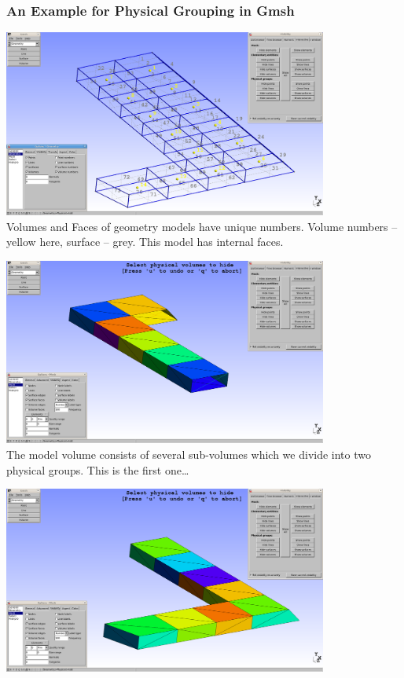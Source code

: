 \begin{frame}
  \frametitle<presentation>{An Example for Physical Grouping in Gmsh}
  \begin{center}
    \includegraphics[width=0.8\textwidth]{./EPS/L/L_numbers_vols_faces}\\[0.5em]
    Volumes and Faces of geometry models have unique numbers. Volume numbers --
    yellow here, surface -- grey. This model has internal faces.
  \end{center}
  \begin{center}
    \includegraphics[width=0.8\textwidth]{./EPS/L/L_volgroup1}\\[0.5em]
    The model volume consists of several sub-volumes which we divide into two
    physical groups. This is the first one\ldots
  \end{center}
  \begin{center}
    \includegraphics[width=0.8\textwidth]{./EPS/L/L_volgroup2}\\[0.5em]

\end{center}
\end{frame}
